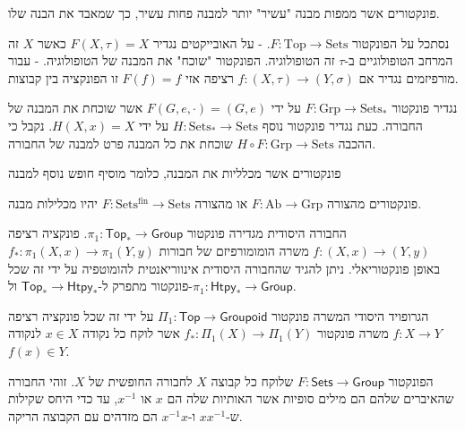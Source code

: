 \documentclass{tstextbook}
\begin{document}
\begin{definition}
פונקטורים אשר ממפות מבנה "עשיר" יותר למבנה פחות עשיר, כך שמאבד את הבנה שלו.

\end{definition}
\begin{example}
נסתכל על הפונקטור \(F:\text{Top}\to\text{Sets}\).
- על האובייקטים נגדיר \(F(X,\tau)=X\) כאשר \(X\) זה המרחב הטופולוגיים ב-\(\tau\) זה הטופולוגיה. הפונקטור "שוכח" את המבנה של הטופולוגיה.
- עבור מורפיזמים נגדיר אם \(f:(X,\tau)\to (Y,\sigma)\) רציפה אזי \(F(f)=f\) זו הפונקציה בין קבוצות.

\end{example}
\begin{example}
נגדיר פונקטור \(F:\text{Grp}\to\text{Sets}_{*}\) על ידי \(F(G,e,\cdot)=(G,e)\) אשר שוכחת את המבנה של החבורה. 
כעת נגדיר פונקטור נוסף \(H:\text{Sets}_{*}\to\text{Sets}\) על ידי \(H(X,x)=X\). נקבל כי ההכבה \(H\circ F:\text{Grp}\to\text{Sets}\) שוכחת את כל המבנה פרט למבנה של החבורה.

\end{example}
\begin{definition}
פונקטורים אשר מכלליות את המבנה, כלומר מוסיף חופש נוסף למבנה

\end{definition}
\begin{example}
פונקטורים מהצורה \(F:\mathrm{Ab}\to \mathrm{Grp}\) או מהצורה \(F:\mathrm{Sets ^{fin}}\to \mathrm{Sets}\) יהיו מכלילות מבנה.

\end{example}
\begin{example}
החבורה היסודית מגדירה פונקטור \(\pi_{1}:\mathsf{Top}_{*}\to \mathsf{Group}\). פונקציה רציפה \(f:(X,x)\to (Y,y)\) משרה הומומורפיזם של חבורות \(f_{*}:\pi_{1}(X,x)\to\pi_{1}(Y,y)\) באופן פונקטוריאלי. ניתן להגיד שהחבורה היסודית אינווריאנטית להומוטפיה על ידי זה שכל פונקטור מתפרק ל-\(\mathsf{Top}_{*}\to \mathsf{Htpy}_{*}\) ול-\(\pi_{1}:\mathsf{Htpy}_{*}\to \mathsf{Group}\).

\end{example}
\begin{example}
הגרופויד היסודי המשרה פונקטור \(\Pi_{1}:\mathsf{Top}\to\mathsf{Groupoid}\) על ידי זה שכל פונקציה רציפה \(f:X\to Y\) משרה פונקטור \(f_{*}:\Pi_{1}(X)\to \Pi_{1}(Y)\) אשר לוקח כל נקודה \(x \in X\) לנקודה \(f(x)\in Y\). 

\end{example}
\begin{example}
הפונקטור \(F:\mathsf{Sets}\to\mathsf{Group}\) שלוקח כל קבוצה \(X\) לחבורה החופשית של \(X\). זוהי החבורה שהאיברים שלהם הם מילים סופיות אשר האותיות שלה הם \(x\) או \(x ^{-1}\), עד כדי היחס שקילות ש-\(x x ^{-1}\) ו-\(x ^{-1} x\) הם מזדהים עם הקבוצה הריקה.

\end{example}
\end{document}

